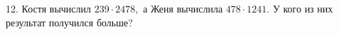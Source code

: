 12. Костя вычислил $239\cdot2478,$ а Женя вычислила $478\cdot1241.$ У кого из них результат получился больше?\\
